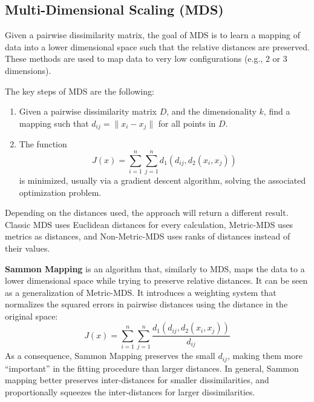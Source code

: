 \subsection{Multi-Dimensional Scaling (MDS)}

Given a pairwise dissimilarity matrix, the goal of MDS is to learn a mapping of data into a lower dimensional space such that the relative distances are preserved. These methods are used to map data to very low configurations (e.g., 2 or 3 dimensions).

The key steps of MDS are the following:
\begin{enumerate}
    \item Given a pairwise dissimilarity matrix $D$, and the dimensionality $k$, find a mapping such that $d_{ij} = \|x_i - x_j\|$ for all points in $D$.

    \item The function
    \begin{equation*}
        J(x) = \sum_{i=1}^n \sum_{j=1}^n d_1 (d_{ij}, d_2(x_i, x_j))
    \end{equation*}
    is minimized, usually via a gradient descent algorithm, solving the associated optimization problem.
\end{enumerate}
Depending on the distances used, the approach will return a different result. Classic MDS uses Euclidean distances for every calculation, Metric-MDS uses metrics as distances, and Non-Metric-MDS uses ranks of distances instead of their values.

\textbf{Sammon Mapping} is an algorithm that, similarly to MDS, maps the data to a lower dimensional space while trying to preserve relative distances. It can be seen as a generalization of Metric-MDS. It introduces a weighting system that normalizes the squared errors in pairwise distances using the distance in the original space:
\begin{equation*}
    J(x) = \sum_{i=1}^n \sum_{j=1}^n \dfrac{d_1 (d_{ij}, d_2(x_i, x_j))}{d_{ij}}
\end{equation*}
As a consequence, Sammon Mapping preserves the small $d_{ij}$, making them more ``important'' in the fitting procedure than larger distances. In general, Sammon mapping better preserves inter-distances for smaller dissimilarities, and proportionally squeezes the inter-distances for larger dissimilarities.

